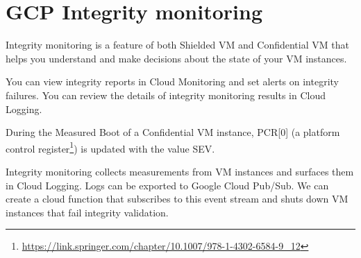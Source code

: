 
\section*{GCP Integrity monitoring}

Integrity monitoring is a feature of both Shielded VM 
and Confidential VM that helps you understand 
and make decisions about the state of your VM instances.

You can view integrity reports in Cloud Monitoring 
and set alerts on integrity failures. 
You can review the details of integrity monitoring results in Cloud Logging.

During the Measured Boot of a Confidential VM instance, 
PCR[0] (a platform control register\footnote{\url{https://link.springer.com/chapter/10.1007/978-1-4302-6584-9_12}}) 
is updated with the value SEV.

Integrity monitoring collects measurements from VM instances 
and surfaces them in Cloud Logging. 
Logs can be exported to Google Cloud Pub/Sub. 
We can create a cloud function that subscribes to this event stream 
and shuts down VM instances that fail integrity validation.


